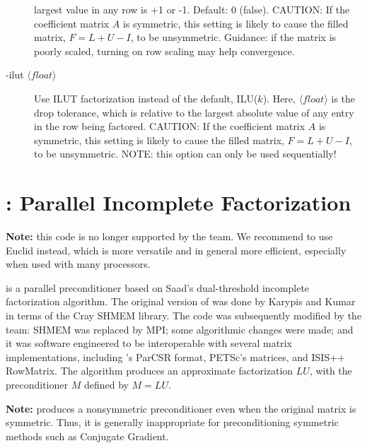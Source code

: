 \begin{description}
                 largest value in any row is +1 or -1.
                 Default: 0 (false).
                 CAUTION: If the coefficient matrix $A$ is symmetric, this 
                 setting is likely to cause the filled matrix,
                 $F = L+U-I$, to be unsymmetric.
                 Guidance: if the matrix is poorly scaled, turning on
                 row scaling may help convergence.
\item[-ilut $\langle float \rangle$] Use ILUT factorization instead
                 of the default, ILU($k$).  Here, $\langle float \rangle$
                 is the drop tolerance, which is relative to the largest 
                 absolute value of any entry in the row being factored.
                 CAUTION: If the coefficient matrix $A$ is symmetric, this 
                 setting is likely to cause the filled matrix,
                 $F = L+U-I$, to be unsymmetric.
                 NOTE: this option can only be used sequentially!
\end{description}


\section{\pilut: Parallel Incomplete Factorization}
\label{PILUT}

{\bf Note:} this code is no longer supported by the \hypre{} team. We recommend to 
use Euclid instead, which is more versatile and in general more efficient, especially
when used with many processors.

\vspace{.3in}
\pilut{} is a parallel preconditioner based on Saad's dual-threshold incomplete
factorization algorithm. The original version of \pilut{} was done by Karypis
and Kumar \cite{GKarypis_VKumar_1998} in terms of the Cray SHMEM library. The
code was subsequently modified by the \hypre{} team: SHMEM was replaced by MPI;
some algorithmic changes were made; and it was software engineered to be
interoperable with several matrix implementations, including \hypre{}'s ParCSR
format, PETSc's matrices, and ISIS++ RowMatrix. The algorithm produces an
approximate factorization $ L U$, with the preconditioner $M$ defined by $ M =
L U $.

{\bf Note:} \pilut{} produces a nonsymmetric preconditioner even when the
original matrix is symmetric. Thus, it is generally inappropriate for
preconditioning symmetric methods such as Conjugate Gradient.

